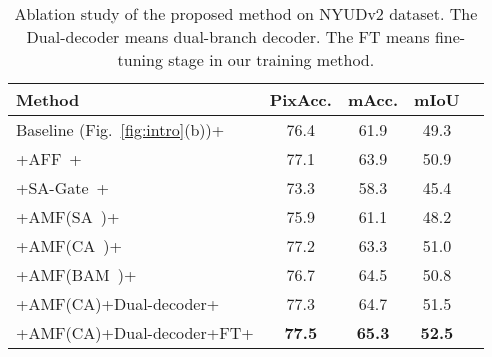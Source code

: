 \documentclass[10pt,twocolumn,letterpaper]{article}
\begin{document}
\begin{table}[!t]
	\renewcommand\arraystretch{1.4}
	\begin{center}
		\footnotesize
		\caption{Ablation study of the proposed method on NYUDv2 dataset. The Dual-decoder means dual-branch decoder. The FT means fine-tuning stage in our training method.}
		\label{tab:ablation}
		
		\begin{tabular}{lcccc}
			\toprule
			Method & PixAcc. & mAcc. & mIoU \\
			\midrule
			Baseline (Fig.~\ref{fig:intro}(b))+  & 76.4 & 61.9 & 49.3 \\
			+AFF~\cite{Dai:WACV21}+              & 77.1 & 63.9 & 50.9 \\
			+SA-Gate~\cite{Chen:ECCV20}+         & 73.3 & 58.3 & 45.4 \\
			+AMF(SA~\cite{Roy:MICCAI18})+        & 75.9 & 61.1 & 48.2 \\
			+AMF(CA~\cite{ZhangYL:ECCV18})+      & 77.2 & 63.3 & 51.0 \\
			+AMF(BAM~\cite{Park:BMVC18})+        & 76.7 & 64.5 & 50.8 \\
			+AMF(CA)+Dual-decoder+                   & 77.3 & 64.7 & 51.5 \\
			+AMF(CA)+Dual-decoder+FT+                & \textbf{77.5} & \textbf{65.3} & \textbf{52.5} \\
			\bottomrule
		\end{tabular}
	\end{center}
\end{table}
\end{document}
